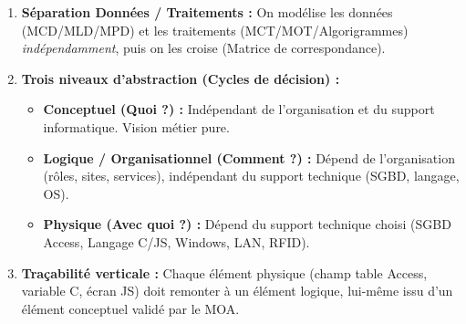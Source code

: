 \documentclass[11pt]{article}
\begin{document}
\begin{definition}
\begin{enumerate}
    \item \textbf{Séparation Données / Traitements :} On modélise les données (MCD/MLD/MPD) et les traitements (MCT/MOT/Algorigrammes) \emph{indépendamment}, puis on les croise (Matrice de correspondance).
    \item \textbf{Trois niveaux d'abstraction (Cycles de décision) :}
    \begin{itemize}
        \item \textbf{Conceptuel (Quoi ?) :} Indépendant de l'organisation et du support informatique. Vision métier pure.
        \item \textbf{Logique / Organisationnel (Comment ?) :} Dépend de l'organisation (rôles, sites, services), indépendant du support technique (SGBD, langage, OS).
        \item \textbf{Physique (Avec quoi ?) :} Dépend du support technique choisi (SGBD Access, Langage C/JS, Windows, LAN, RFID).
    \end{itemize}
    \item \textbf{Traçabilité verticale :} Chaque élément physique (champ table Access, variable C, écran JS) doit remonter à un élément logique, lui-même issu d'un élément conceptuel validé par le MOA.
\end{enumerate}
\end{definition}
\end{document}
